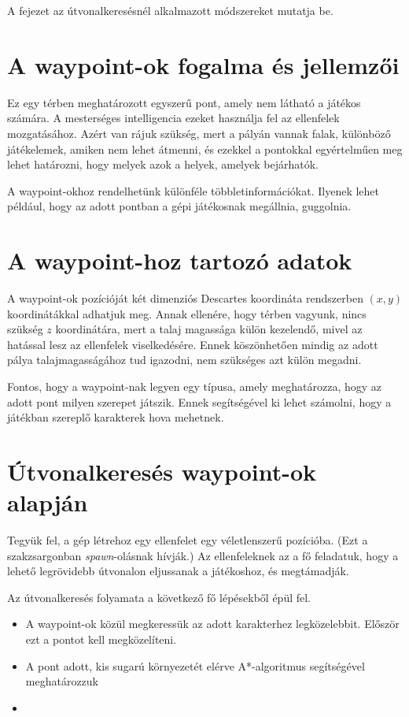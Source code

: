 \label{Chap:utvonalkereses}

A fejezet az útvonalkeresésnél alkalmazott módszereket mutatja be.

\section{A waypoint-ok fogalma és jellemzői}

Ez egy térben meghatározott egyszerű pont, amely nem látható a játékos számára. A mesterséges intelligencia ezeket használja fel az ellenfelek mozgatásához. Azért van rájuk szükség, mert a pályán vannak falak, különböző játékelemek, amiken nem lehet átmenni, és ezekkel a pontokkal egyértelműen meg lehet határozni, hogy melyek azok a helyek, amelyek bejárhatók.

A waypoint-okhoz rendelhetünk különféle többletinformációkat. Ilyenek lehet például, hogy az adott pontban a gépi játékosnak megállnia, guggolnia.

\section{A waypoint-hoz tartozó adatok}

A waypoint-ok pozícióját két dimenziós Descartes koordináta rendszerben $(x, y)$ koordinátákkal adhatjuk meg. Annak ellenére, hogy térben vagyunk, nincs szükség $z$ koordinátára, mert a talaj magassága külön kezelendő, mivel az hatással lesz az ellenfelek viselkedésére. Ennek köszönhetően mindig az adott pálya talajmagasságához tud igazodni, nem szükséges azt külön megadni.

Fontos, hogy a waypoint-nak legyen egy típusa, amely meghatározza, hogy az adott pont milyen szerepet játszik. Ennek segítségével ki lehet számolni, hogy a játékban szereplő karakterek hova mehetnek.

\section{Útvonalkeresés waypoint-ok alapján}

Tegyük fel, a gép létrehoz egy ellenfelet egy véletlenszerű pozícióba. (Ezt a szakzsargonban \textit{spawn}-olásnak hívják.) Az ellenfeleknek az a fő feladatuk, hogy a lehető legrövidebb útvonalon eljussanak a játékoshoz, és megtámadják. 

Az útvonalkeresés folyamata a következő fő lépésekből épül fel.
\begin{itemize}
\item A waypoint-ok közül megkeressük az adott karakterhez legközelebbit. Először ezt a pontot kell megközelíteni.
\item A pont adott, kis sugarú környezetét elérve A*-algoritmus segítségével meghatározzuk
\item 
\end{itemize}

